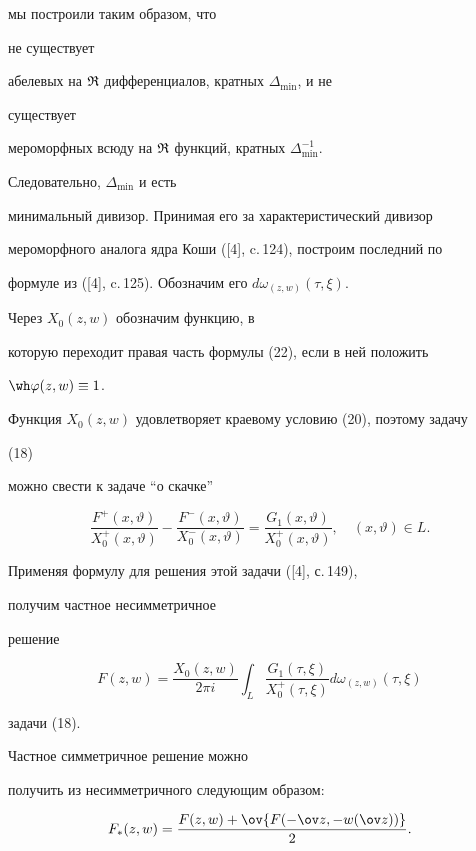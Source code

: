 мы построили таким образом, что 


не существует 


абелевых на $\frak R$ дифференциалов, кратных $\Delta_{\min}$, и не 


существует 


мероморфных всюду на $\frak R$ функций, кратных $\Delta^{-1}_{\min}$. 


Следовательно, $\Delta_{\min}$ и есть 


минимальный дивизор. Принимая его за характеристический дивизор 


мероморфного аналога ядра Коши ([4], c.\,124), построим последний по 


формуле из ([4], c.\,125). Обозначим его $d\omega_{(z,w)}(\tau,\xi)$. 


Через $X_0(z,w)$ обозначим функцию, в 


которую переходит правая часть формулы (22), если в ней положить 


$\wh\varphi(z,w)\equiv1$. 


Функция $X_0(z,w)$ удовлетворяет краевому условию (20), поэтому задачу 


(18) 


можно свести к задаче ``о скачке''


$$ 


\frac{F^+(x,\vartheta)}{X^+_0(x,\vartheta)}- 


\frac{F^-(x,\vartheta)}{X^-_0(x,\vartheta)}= 


\frac{G_1(x,\vartheta)}{X^+_0(x,\vartheta)}, 


\quad (x,\vartheta)\in L. 


$$ 


Применяя формулу для решения этой задачи ([4], с.\,149), 


получим частное несимметричное 


решение 


$$ 


F(z,w)=\frac{X_0(z,w)}{2\pi i}\int_L 


\frac{G_1(\tau,\xi)}{X^+_0(\tau,\xi)}d\omega_{(z,w)}(\tau,\xi) 


$$ 


задачи (18). 


 


Частное симметричное решение можно 


получить из несимметричного следующим образом: 


\begin{equation} 


F_*(z,w)= 


\frac{F(z,w)+\ov{F(-\ov z,-w(\ov z))}}{2}. 


\end{equation} 


